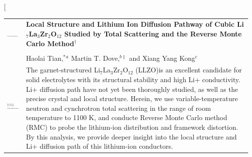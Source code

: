 \documentclass[twoside,twocolumn,9pt]{article}
\begin{document}
\twocolumn[
  \begin{@twocolumnfalse}
\vspace{3cm}
\sffamily
\begin{tabular}{m{4.5cm} p{13.5cm} }

\includegraphics{head_foot/DOI} & \noindent\LARGE{\textbf{Local Structure and Lithium Ion Diffusion Pathway of Cubic Li$_7$La$_3$Zr$_2$O$_{12}$ Studied by Total Scattering and the Reverse Monte Carlo Method$^\dag$}} \\%
\vspace{0.3cm} & \vspace{0.3cm} \\

 & \noindent\large{Haolai Tian,$^{\ast}$\textit{$^{a}$} Martin T. Dove,\textit{$^{b\ddag}$} and Xiang Yang Kong\textit{$^{c}$}} \\%

\includegraphics{head_foot/dates} & \noindent\normalsize{ The garnet-structured Li$_7$La$_3$Zr$_2$O$_12$ (LLZO)is an excellent candidate for solid electrolytes with its structural stability and high Li+ conductivity. Li+ diffusion path have not yet been thoroughly studied, as well as the precise crystal and local structure. Herein, we use variable-temperature neutron and cynchrotron total scattering in the range of room temperature to 1100 K, and conducte 
Reverse Monte Carlo method (RMC) to probe the lithium-ion distribution and framework distortion.
By this analysis, we provide deeper insight into the local structure and Li+ diffusion path of this lithium-ion conductors.

} \\

\end{tabular}

 \end{@twocolumnfalse} \vspace{0.6cm}
\end{document}
